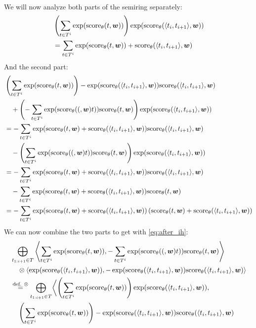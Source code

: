 \documentclass[a4paper,12pt]{ETHexercise}
\begin{document}
\begin{question}
\begin{subquestion}
\begin{align}
		\end{align}
		We will now analyze both parts of the semiring separately:
		\begin{align}
			 & \left(\sum_{t \in T^{i}} \exp(\text{score}_{\theta}(t, \boldsymbol{w})) \right) \exp(\text{score}_{\theta}(\langle t_i, t_{i+1} \rangle, \boldsymbol{w}))                \\
			 & = \sum_{t \in T^{i}} \exp(\text{score}_{\theta}(t, \boldsymbol{w})) + \text{score}_{\theta}(\langle t_i, t_{i+1} \rangle, \boldsymbol{w})               \label{eq:semil}
		\end{align}
		And the second part:
		\begin{align}
			 & \left( \sum_{t \in T^{i}} \exp(\text{score}_{\theta}(t, \boldsymbol{w})) \right) -\exp(\text{score}_{\theta}(\langle t_i, t_{i+1} \rangle, \boldsymbol{w})) \text{score}_{\theta}(\langle t_i, t_{i+1} \rangle, \boldsymbol{w}) \nonumber                   \\
			 & \quad + \left( -\sum_{t \in T^{i}} \exp(\text{score}_{\theta}((, \boldsymbol{w})t)) \text{score}_{\theta}(t, \boldsymbol{w}) \right) \exp(\text{score}_{\theta}(\langle t_i, t_{i+1} \rangle, \boldsymbol{w}))                               \\
			 & = -\sum_{t \in T^{i}} \exp(\text{score}_{\theta}(t, \boldsymbol{w}) + \text{score}_{\theta}(\langle t_i, t_{i+1} \rangle, \boldsymbol{w})) \text{score}_{\theta}(\langle t_i, t_{i+1} \rangle, \boldsymbol{w}) \nonumber                                    \\
			 & \quad -\left( \sum_{t \in T^{i}} \exp(\text{score}_{\theta}((, \boldsymbol{w})t)) \text{score}_{\theta}(t, \boldsymbol{w}) \right) \exp(\text{score}_{\theta}(\langle t_i, t_{i+1} \rangle, \boldsymbol{w}))                                 \\
			 & = -\sum_{t \in T^{i}} \exp(\text{score}_{\theta}(t, \boldsymbol{w}) + \text{score}_{\theta}(\langle t_i, t_{i+1} \rangle, \boldsymbol{w})) \text{score}_{\theta}(\langle t_i, t_{i+1} \rangle, \boldsymbol{w}) \nonumber                                    \\
			 & \quad - \sum_{t \in T^{i}} \exp(\text{score}_{\theta}(t, \boldsymbol{w}) + \text{score}_{\theta}(\langle t_i, t_{i+1} \rangle, \boldsymbol{w})) \text{score}_{\theta}(t, \boldsymbol{w})                                                   \\
			 & = -\sum_{t \in T^{i}} \exp(\text{score}_{\theta}(t, \boldsymbol{w}) + \text{score}_{\theta}(\langle t_i, t_{i+1} \rangle, \boldsymbol{w})) \left( \text{score}_{\theta}(t, \boldsymbol{w}) + \text{score}_{\theta}(\langle t_i, t_{i+1} \rangle, \boldsymbol{w}) \right) \label{eq:semir}
		\end{align}
		We can now combine the two parts to get with \cref{eq:after_ih}:
		\begin{align}
			 & \bigoplus_{t_{1:i+1} \in T} \left\langle \sum_{t \in T^{i}} \exp(\sscore{t}), -\sum_{t \in T^{i}} \exp(\sscore(t)) \sscore{t} \right\rangle \nonumber               \\
			 & \quad \otimes \left\langle \exp(\score{t_i}{t_{i+1}}), -\exp(\score{t_i}{t_{i+1}}) \score{t_i}{t_{i+1}}\right\rangle                                                \\
			 & \overset{\text{def. } \otimes}{=} \bigoplus_{t_{1:i+1} \in T} \biggl\langle \left(\sum_{t \in T^{i}} \exp(\sscore{t}) \right) \exp(\score{t_i}{t_{i+1}}), \nonumber \\
			 & \quad \left( \sum_{t \in T^{i}} \exp(\sscore{t}) \right) -\exp(\score{t_i}{t_{i+1}}) \score{t_i}{t_{i+1}} \nonumber                                                 \\

\end{align}
\end{subquestion}
\end{question}
\end{document}
